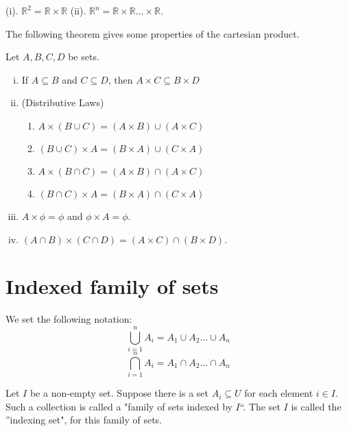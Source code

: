\documentclass[a4paper,english,12pt]{article}
\newcommand{\Real}{\mathbb{R}}
\begin{document}
\begin{exmp}
(i). $\Real^{2} = \Real \times \Real$ (ii). $\Real^{n} = \Real \times \Real \dots \times \Real$.
\end{exmp}

The following theorem gives some properties of the cartesian product.
\begin{thm}
 Let $A, B, C, D$ be sets.
 \begin{enumerate}[i)]
  \item If $A \subseteq B$ and $C \subseteq D$, then $A \times C \subseteq B \times D$
  \item (Distributive Laws)
  \begin{enumerate}
   \item $A \times (B \cup C) = (A \times B) \cup (A \times C)$ 
   \item $(B \cup C) \times A = (B \times A) \cup (C \times A)$
   \item $A \times (B \cap C) = (A \times B) \cap (A \times C)$
   \item $(B \cap C) \times A = (B \times A) \cap (C \times A)$
  \end{enumerate}
  \item $A \times \phi = \phi$ and $\phi \times A = \phi$.
  \item $(A \cap B) \times (C \cap D) = (A \times C) \cap (B \times D)$.
\end{enumerate}

\end{thm}

\section{Indexed family of sets}
We set the following notation:
\begin{equation*}
 \bigcup_{i = 1}^{n} A_{i} = A_{1} \cup A_{2} \dots \cup A_{n}
 \nonumber
\end{equation*}
\begin{equation*}
 \bigcap_{i = 1}^{n} A_{i} = A_{1} \cap A_{2} \dots \cap A_{n}
 \nonumber
\end{equation*}

\begin{defn}
 Let $I$ be a non-empty set. Suppose there is a set $A_{i} \subseteq U$ for each element $i \in I$. Such a collection is called a 
 "family of sets indexed by $I$``. The set $I$ is called the ''indexing set", for this family of sets. 
\end{defn}
\end{document}
